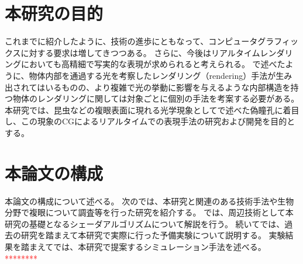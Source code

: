 

\section{本研究の目的}
\label{SObjective}

これまでに紹介したように、技術の進歩にともなって、コンピュータグラフィックスに対する要求は増してきつつある。
さらに、今後はリアルタイムレンダリングにおいても高精細で写実的な表現が求められると考えられる。
で述べたように、物体内部を通過する光を考察したレンダリング（rendering）手法が生み出されてはいるものの、より複雑で光の挙動に影響を与えるような内部構造を持つ物体のレンダリングに関しては対象ごとに個別の手法を考案する必要がある。
本研究では、昆虫などの複眼表面に現れる光学現象としてで述べた偽瞳孔に着目し、この現象のCGによるリアルタイムでの表現手法の研究および開発を目的とする。

\section{本論文の構成}
\label{SPaper_structure}

本論文の構成について述べる。
次のでは、本研究と関連のある技術手法や生物分野で複眼について調査等を行った研究を紹介する。
では、周辺技術として本研究の基礎となるシェーダアルゴリズムについて解説を行う。
続いてでは、過去の研究を踏まえて本研究で実際に行った予備実験について説明する。
実験結果を踏まえてでは、本研究で提案するシミュレーション手法を述べる。
\textcolor{red}{********}
